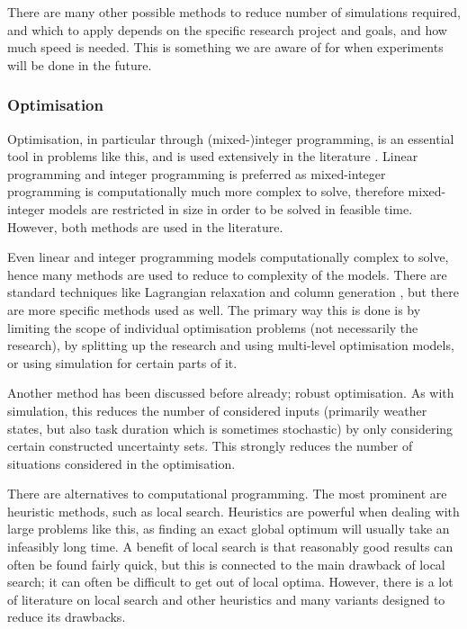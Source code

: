\documentclass[a4paper,12pt]{article}
\begin{document}
There are many other possible methods to reduce number of simulations required, and which to apply depends on the specific research project and goals, and how much speed is needed. This is something we are aware of for when experiments will be done in the future. 

\subsubsection{Optimisation} \label{ss:opt}
Optimisation, in particular through (mixed-)integer programming, is an essential tool in problems like this, and is used extensively in the literature \cite{nemhauser1999integer,lee2011mixed}. Linear programming and integer programming is preferred as mixed-integer programming is computationally much more complex to solve, therefore mixed-integer models are restricted in size in order to be solved in feasible time. However, both methods are used in the literature.

Even linear and integer programming models computationally complex to solve, hence many methods are used to reduce to complexity of the models. There are standard techniques like Lagrangian relaxation \cite{fisher1981lagrangian} and column generation \cite{barnhart1998branch}, but there are more specific methods used as well. The primary way this is done is by limiting the scope of individual optimisation problems (not necessarily the research), by splitting up the research and using multi-level optimisation models, or using simulation for certain parts of it. 

Another method has been discussed before already; robust optimisation. As with simulation, this reduces the number of considered inputs (primarily weather states, but also task duration which is sometimes stochastic) by only considering certain constructed uncertainty sets. This strongly reduces the number of situations considered in the optimisation. 

\bigskip

There are alternatives to computational programming. The most prominent are heuristic methods, such as local search. Heuristics are powerful when dealing with large problems like this, as finding an exact global optimum will usually take an infeasibly long time. A benefit of local search is that reasonably good results can often be found fairly quick, but this is connected to the main drawback of local search; it can often be difficult to get out of local optima. However, there is a lot of literature on local search and other heuristics and many variants designed to reduce its drawbacks. 
\end{document}
